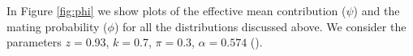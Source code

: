 \documentclass[12pt,a4paper]{article}
\theoremstyle{plain}%
\theoremstyle{definition}
\theoremstyle{remark}
\newcommand{\minitab}[2][l]{\begin{tabular}{#1}#2\end{tabular}}%
\begin{document}
	
	
	In Figure \ref{fig:phi} we show plots of the effective mean contribution ($\psi$) and the mating probability ($\phi$) for all the distributions discussed above. We consider the parameters $z=$0.93, $k=$0.7, $\pi=$0.3, $\alpha=0.574$ (\cite{seo1979egg}). %
	
	
\end{document}
